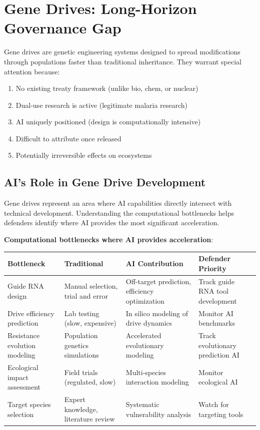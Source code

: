 \documentclass[11pt,letterpaper]{article}
\begin{document}
\section{Gene Drives: Long-Horizon Governance Gap}

Gene drives are genetic engineering systems designed to spread modifications through populations faster than traditional inheritance. They warrant special attention because:
\begin{enumerate}
  \item No existing treaty framework (unlike bio, chem, or nuclear)
  \item Dual-use research is active (legitimate malaria research)
  \item AI uniquely positioned (design is computationally intensive)
  \item Difficult to attribute once released
  \item Potentially irreversible effects on ecosystems
\end{enumerate}

\subsection{AI's Role in Gene Drive Development}

Gene drives represent an area where AI capabilities directly intersect with technical development. Understanding the computational bottlenecks helps defenders identify where AI provides the most significant acceleration.

\textbf{Computational bottlenecks where AI provides acceleration}:

\begin{center}
\small
\begin{tabular}{L{2.5cm}L{3cm}L{3.5cm}L{3cm}}
\toprule
\textbf{Bottleneck} & \textbf{Traditional} & \textbf{AI Contribution} & \textbf{Defender Priority} \\
\midrule
Guide RNA design & Manual selection, trial and error & Off-target prediction, efficiency optimization & Track guide RNA tool development \\
Drive efficiency prediction & Lab testing (slow, expensive) & In silico modeling of drive dynamics & Monitor AI benchmarks \\
Resistance evolution modeling & Population genetics simulations & Accelerated evolutionary modeling & Track evolutionary prediction AI \\
Ecological impact assessment & Field trials (regulated, slow) & Multi-species interaction modeling & Monitor ecological AI \\
Target species selection & Expert knowledge, literature review & Systematic vulnerability analysis & Watch for targeting tools \\
\bottomrule
\end{tabular}
\end{center}
\end{document}
